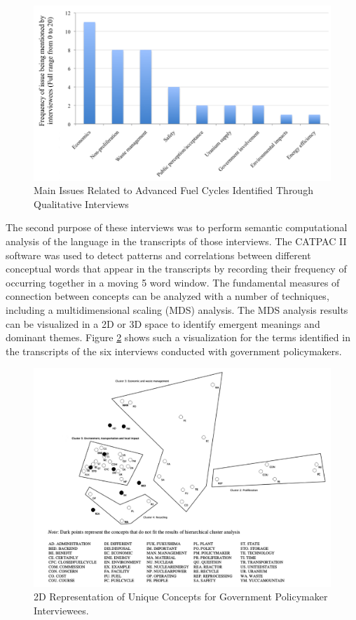 \begin{figure}[htbp]
  \centering
  \includegraphics[width=0.7\columnwidth]{./images/interview_2}
  \caption{Main Issues Related to Advanced Fuel Cycles Identified Through Qualitative Interviews}
  \label{fig:interview_2}
\end{figure}

The second purpose of these interviews was to perform semantic computational
analysis of the language in the transcripts of those interviews.  The CATPAC
II software was used to detect patterns and correlations between different
conceptual words that appear in the transcripts by recording their frequency
of occurring together in a moving 5 word window.  The fundamental measures of
connection between concepts can be analyzed with a number of techniques,
including a multidimensional scaling (MDS) analysis.  The MDS analysis results
can be visualized in a 2D or 3D space to identify emergent meanings and
dominant themes.  Figure \ref{fig:word_frequency_mds} shows such a
visualization for the terms identified in the transcripts of the six
interviews conducted with government policymakers.

\begin{figure}[htbp]
  \centering
  \includegraphics[width=0.7\columnwidth]{./images/word_frequency_mds}
  \caption{2D Representation of Unique Concepts for Government Policymaker Interviewees.}
  \label{fig:word_frequency_mds}
\end{figure}

